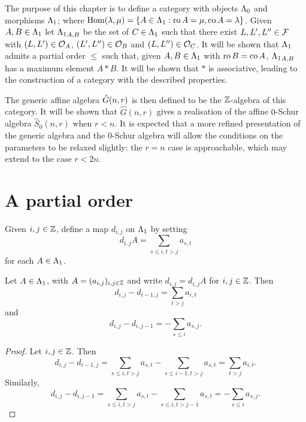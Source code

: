 \documentclass[a4paper, 11pt]{report}
\begin{document}
The purpose of this chapter is to define a category with objects ${\Lambda_0}$ and morphisms ${\Lambda_1}$; where $\operatorname{Hom}(\lambda,\mu) = \{A\in{\Lambda_1}: \operatorname{ro}{A}=\mu,\operatorname{co}{A}=\lambda\}$. Given $A,B\in{\Lambda_1}$ let ${\Lambda_1}_{A,B}$ be the set of $C\in{\Lambda_1}$ such that there exist $L,L',L''\in\mathcal{F}$ with $(L,L')\in\mathcal{O}_{A}$, $(L',L'')\in\mathcal{O}_{B}$ and $(L,L'')\in\mathcal{O}_{C}$. It will be shown that ${\Lambda_1}$ admits a partial order $\le$ such that, given $A,B\in{\Lambda_1}$ with $\operatorname{ro}{B}=\operatorname{co}{A}$, ${\Lambda_1}_{A,B}$ has a maximum element $A\ast B$. It will be shown that $\ast$ is associative, leading to the construction of a category with the described properties.

The generic affine algebra $\hat{G}(n,r)$ is then defined to be the $\mathbb{Z}$-algebra of this category. It will be shown that $\hat{G}(n,r)$ gives a realisation of the affine $0$-Schur algebra $\hat{S}_0(n,r)$ when $r<n$. It is expected that a more refined presentation of the generic algebra and the $0$-Schur algebra will allow the conditions on the parameters to be relaxed slightly: the $r=n$ case is approachable, which may extend to the case $r<2n$.

\section{A partial order}

Given $i,j\in\mathbb{Z}$, define a map $d_{i,j}$ on ${\Lambda_1}$ by setting
\begin{equation*}
d_{i,j}A = \sum_{s\le i,t>j} a_{s,t}
\end{equation*}
for each $A\in{\Lambda_1}$.

\begin{lemma}\label{lemma:differentials}
Let $A\in{\Lambda_1}$, with $A=(a_{i,j})_{i,j\in\mathbb{Z}}$ and write $d_{i,j} = d_{i,j}A$ for $i,j\in\mathbb{Z}$. Then
\begin{equation*}
d_{i,j} - d_{i-1,j} = \sum_{t>j}a_{i,t}
\end{equation*}
and
\begin{equation*}
d_{i,j}-d_{i,j-1} = - \sum_{s\le i}a_{s,j}.
\end{equation*}
\end{lemma}

\begin{proof}
Let $i,j\in\mathbb{Z}$. Then
\begin{equation*}
d_{i,j} - d_{i-1,j} = \sum_{s\le i,t>j}a_{s,t} - \sum_{s\le i-1,t>j}a_{s,t} = \sum_{t>j}a_{i,t}.
\end{equation*}
Similarly,
\begin{equation*}
d_{i,j}-d_{i,j-1} = \sum_{s\le i,t>j}a_{s,t} - \sum_{s\le i,t>j-1}a_{s,t} = -\sum_{s\le i}a_{s,j}.
\end{equation*}
\end{proof}
\end{document}
